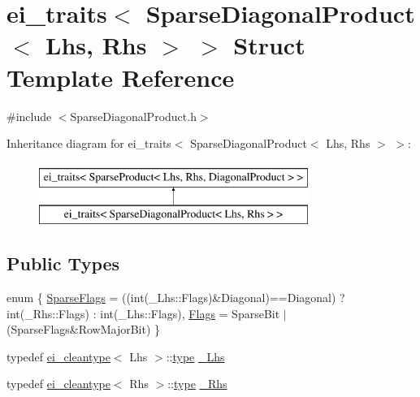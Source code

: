 \hypertarget{structei__traits_3_01_sparse_diagonal_product_3_01_lhs_00_01_rhs_01_4_01_4}{\section{ei\-\_\-traits$<$ Sparse\-Diagonal\-Product$<$ Lhs, Rhs $>$ $>$ Struct Template Reference}
\label{structei__traits_3_01_sparse_diagonal_product_3_01_lhs_00_01_rhs_01_4_01_4}
}


{\ttfamily \#include $<$Sparse\-Diagonal\-Product.\-h$>$}

Inheritance diagram for ei\-\_\-traits$<$ Sparse\-Diagonal\-Product$<$ Lhs, Rhs $>$ $>$\-:\begin{figure}[H]
\begin{center}
\leavevmode
\includegraphics[height=2.000000cm]{structei__traits_3_01_sparse_diagonal_product_3_01_lhs_00_01_rhs_01_4_01_4}
\end{center}
\end{figure}
\subsection*{Public Types}
\begin{DoxyCompactItemize}
\item 
enum \{ \hyperlink{structei__traits_3_01_sparse_diagonal_product_3_01_lhs_00_01_rhs_01_4_01_4_abe5298206f950e6ab261fec4055a13d4a8c635702ad9954da7cf44e9c1b987dd5}{Sparse\-Flags} = ((int(\-\_\-\-Lhs\-:\-:Flags)\&Diagonal)==Diagonal) ? int(\-\_\-\-Rhs\-:\-:Flags) \-: int(\-\_\-\-Lhs\-:\-:Flags), 
\hyperlink{structei__traits_3_01_sparse_diagonal_product_3_01_lhs_00_01_rhs_01_4_01_4_abe5298206f950e6ab261fec4055a13d4a4b77a525aa7ef2922e27c8cf86d38005}{Flags} = Sparse\-Bit $|$ (Sparse\-Flags\&Row\-Major\-Bit)
 \}
\item 
typedef \hyperlink{structei__cleantype}{ei\-\_\-cleantype}$<$ Lhs $>$\-::\hyperlink{glext_8h_a7d05960f4f1c1b11f3177dc963a45d86}{type} \hyperlink{structei__traits_3_01_sparse_diagonal_product_3_01_lhs_00_01_rhs_01_4_01_4_a65e89474c7c726c265f8379dffa7186f}{\-\_\-\-Lhs}
\item 
typedef \hyperlink{structei__cleantype}{ei\-\_\-cleantype}$<$ Rhs $>$\-::\hyperlink{glext_8h_a7d05960f4f1c1b11f3177dc963a45d86}{type} \hyperlink{structei__traits_3_01_sparse_diagonal_product_3_01_lhs_00_01_rhs_01_4_01_4_aec3651785ab006cde359b60aac5564f5}{\-\_\-\-Rhs}
\end{DoxyCompactItemize}


